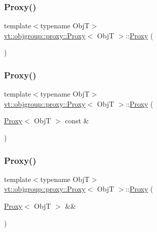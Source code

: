 \subsubsection{\texorpdfstring{Proxy()}{Proxy()}\hspace{0.1cm}{\footnotesize\ttfamily [1/4]}}
{\footnotesize\ttfamily template$<$typename ObjT$>$ \\
\hyperlink{structvt_1_1objgroup_1_1proxy_1_1_proxy}{vt\+::objgroup\+::proxy\+::\+Proxy}$<$ ObjT $>$\+::\hyperlink{structvt_1_1objgroup_1_1proxy_1_1_proxy}{Proxy} (\begin{DoxyParamCaption}{ }\end{DoxyParamCaption})\hspace{0.3cm}{\ttfamily [default]}}

\mbox{\label{structvt_1_1objgroup_1_1proxy_1_1_proxy_ad12a9b75a3c4844144d7a159b11af5ec}} 
\subsubsection{\texorpdfstring{Proxy()}{Proxy()}\hspace{0.1cm}{\footnotesize\ttfamily [2/4]}}
{\footnotesize\ttfamily template$<$typename ObjT$>$ \\
\hyperlink{structvt_1_1objgroup_1_1proxy_1_1_proxy}{vt\+::objgroup\+::proxy\+::\+Proxy}$<$ ObjT $>$\+::\hyperlink{structvt_1_1objgroup_1_1proxy_1_1_proxy}{Proxy} (\begin{DoxyParamCaption}\item[{\hyperlink{structvt_1_1objgroup_1_1proxy_1_1_proxy}{Proxy}$<$ ObjT $>$ const \&}]{ }\end{DoxyParamCaption})\hspace{0.3cm}{\ttfamily [default]}}

\mbox{\label{structvt_1_1objgroup_1_1proxy_1_1_proxy_a8711a58bb0444c24553527b6ed9d0cfb}} 
\subsubsection{\texorpdfstring{Proxy()}{Proxy()}\hspace{0.1cm}{\footnotesize\ttfamily [3/4]}}
{\footnotesize\ttfamily template$<$typename ObjT$>$ \\
\hyperlink{structvt_1_1objgroup_1_1proxy_1_1_proxy}{vt\+::objgroup\+::proxy\+::\+Proxy}$<$ ObjT $>$\+::\hyperlink{structvt_1_1objgroup_1_1proxy_1_1_proxy}{Proxy} (\begin{DoxyParamCaption}\item[{\hyperlink{structvt_1_1objgroup_1_1proxy_1_1_proxy}{Proxy}$<$ ObjT $>$ \&\&}]{ }\end{DoxyParamCaption})\hspace{0.3cm}{\ttfamily [default]}}

